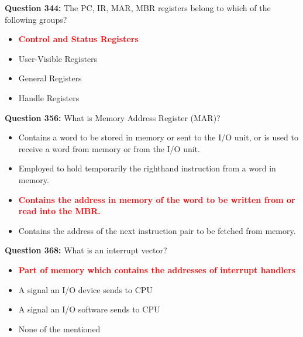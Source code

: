 \documentclass[12pt,a4paper]{article}
\begin{document}
\vspace{0.5cm}

\textbf{Question 344:} The PC, IR, MAR, MBR registers belong to which of the following groups?

\begin{itemize}
    \item[\textbf{A.}] \textcolor{red}{\textbf{Control and Status Registers}}
    \item[\textbf{B.}] User-Visible Registers
    \item[\textbf{C.}] General Registers
    \item[\textbf{D.}] Handle Registers
\end{itemize}

\vspace{0.5cm}

\textbf{Question 356:} What is Memory Address Register (MAR)?

\begin{itemize}
    \item[\textbf{A.}] Contains a word to be stored in memory or sent to the I/O unit, or is used to receive a word from memory or from the I/O unit.
    \item[\textbf{B.}] Employed to hold temporarily the righthand instruction from a word in memory.
    \item[\textbf{C.}] \textcolor{red}{\textbf{Contains the address in memory of the word to be written from or read into the MBR.}}
    \item[\textbf{D.}] Contains the address of the next instruction pair to be fetched from memory.
\end{itemize}

\vspace{0.5cm}

\textbf{Question 368:} What is an interrupt vector?

\begin{itemize}
    \item[\textbf{A.}] \textcolor{red}{\textbf{Part of memory which contains the addresses of interrupt handlers}}
    \item[\textbf{B.}] A signal an I/O device sends to CPU
    \item[\textbf{C.}] A signal an I/O software sends to CPU
    \item[\textbf{D.}] None of the mentioned
\end{itemize}

\vspace{0.5cm}
\end{document}
